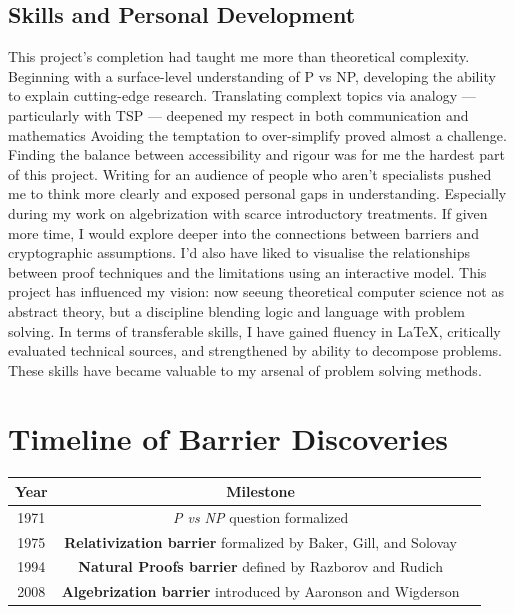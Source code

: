 \documentclass[12pt]{report}
\begin{document}
\subsection*{Skills and Personal Development}
This project's completion had taught me more than theoretical complexity.
Beginning with a surface-level understanding of P vs NP, developing the ability to explain cutting-edge research.
Translating complext topics via analogy --- particularly with TSP --- deepened my respect in both communication and mathematics
Avoiding the temptation to over-simplify proved almost a challenge.
Finding the balance between accessibility and rigour was for me the hardest part of this project.
Writing for an audience of people who aren't specialists pushed me to think more clearly and exposed personal gaps in understanding.
Especially during my work on algebrization with scarce introductory treatments.
If given more time, I would explore deeper into the connections between barriers and cryptographic assumptions.
I'd also have liked to visualise the relationships between proof techniques and the limitations using an interactive model.
This project has influenced my vision: now seeung theoretical computer science not as abstract theory, but a discipline blending logic and language with problem solving.
In terms of transferable skills, I have gained fluency in \LaTeX{}, critically evaluated technical sources, and strengthened by ability to decompose problems.
These skills have became valuable to my arsenal of problem solving methods.

\section*{Timeline of Barrier Discoveries}
\begin{tabular}{|c|c p{10cm}|}
\hline
\textbf{Year} & \textbf{Milestone} \\
\hline
1971 & \textit{P vs NP} question formalized \\
\hline
1975 & \textbf{Relativization barrier} formalized by Baker, Gill, and Solovay \cite{baker1975} \\
\hline
1994 & \textbf{Natural Proofs barrier} defined by Razborov and Rudich \cite{razborov1994} \\
\hline
2008 & \textbf{Algebrization barrier} introduced by Aaronson and Wigderson \cite{arora2009, aaronson2008algebrization} \\
\hline
\end{tabular}

\newpage
\end{document}
